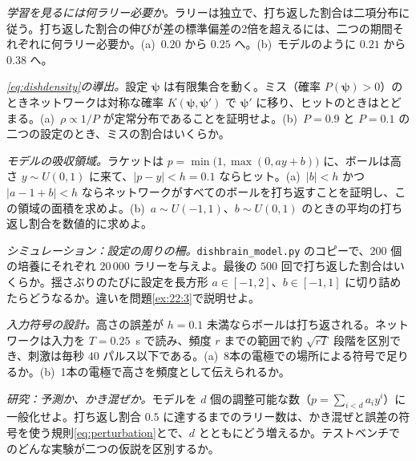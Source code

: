 \begin{exercise}[\lvlA]
\label{ex:22:2}
\emph{学習を見るには何ラリー必要か。}ラリーは独立で、打ち返した割合は二項分布に従う。打ち返した割合の伸びが差の標準偏差の2倍を超えるには、二つの期間それぞれに何ラリー必要か。(a)~$0.20$ から $0.25$ へ。(b)~モデルのように $0.21$ から $0.38$ へ。
\end{exercise}

\begin{exercise}[\lvlB]
\label{ex:22:3}
\emph{\eqref{eq:dishdensity}の導出。}設定 $\boldsymbol\psi$ は有限集合を動く。ミス（確率 $P(\boldsymbol\psi)>0$）のときネットワークは対称な確率 $K(\boldsymbol\psi,\boldsymbol\psi')$ で $\boldsymbol\psi'$ に移り、ヒットのときはとどまる。(a)~$\rho\propto1/P$ が定常分布であることを証明せよ。(b)~$P=0.9$ と $P=0.1$ の二つの設定のとき、ミスの割合はいくらか。
\end{exercise}

\begin{exercise}[\lvlB]
\label{ex:22:4}
\emph{モデルの吸収領域。}ラケットは $p=\min\bigl(1,\max(0,ay+b)\bigr)$ に、ボールは高さ $y\sim U(0,1)$ に来て、$|p-y|<h=0.1$ ならヒット。(a)~$|b|<h$ かつ $|a-1+b|<h$ ならネットワークがすべてのボールを打ち返すことを証明し、この領域の面積を求めよ。(b)~$a\sim U(-1,1)$、$b\sim U(0,1)$ のときの平均の打ち返し割合を数値的に求めよ。
\end{exercise}

\begin{exercise}[\lvlB]
\label{ex:22:5}
\emph{シミュレーション：設定の周りの柵。}\texttt{dishbrain\_model.py} のコピーで、$200$ 個の培養にそれぞれ $20\,000$ ラリーを与えよ。最後の $500$ 回で打ち返した割合はいくらか。揺さぶりのたびに設定を長方形 $a\in[-1,2]$、$b\in[-1,1]$ に切り詰めたらどうなるか。違いを問題\ref{ex:22:3}で説明せよ。
\end{exercise}

\begin{exercise}[\lvlB]
\label{ex:22:6}
\emph{入力符号の設計。}高さの誤差が $h=0.1$ 未満ならボールは打ち返される。ネットワークは入力を $T=0.25$~s で読み、頻度 $r$ までの範囲で約 $\sqrt{rT}$ 段階を区別でき、刺激は毎秒 $40$ パルス以下である。(a)~8本の電極での場所による符号で足りるか。(b)~1本の電極で高さを頻度として伝えられるか。
\end{exercise}

\begin{exercise}[\lvlC]
\label{ex:22:7}
\emph{研究：予測か、かき混ぜか。}モデルを $d$ 個の調整可能な数（$p=\sum_{i<d}a_iy^i$）に一般化せよ。打ち返し割合 $0.5$ に達するまでのラリー数は、かき混ぜと誤差の符号を使う規則\eqref{eq:perturbation}とで、$d$ とともにどう増えるか。テストベンチでのどんな実験が二つの仮説を区別するか。
\end{exercise}
